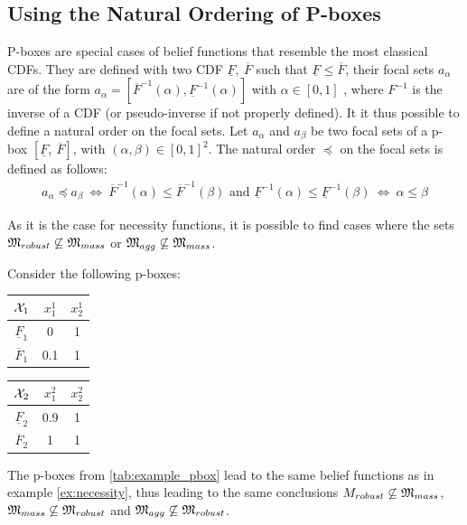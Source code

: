 \subsection{Using the Natural Ordering of P-boxes}\label{subsec:pboxes}
P-boxes are special cases of belief functions that resemble the most classical CDFs. They are defined with two CDF $\underline{F},~\overline{F}$ such that $\underline{F}\leqslant\overline{F}$, their focal sets $a_\alpha$ are of the form $a_\alpha=[\overline{F}^{-1}(\alpha), \underline{F}^{-1}(\alpha)]$ with $\alpha\in[0,1]$ \cite{destercke_unifying_2008}, where $F^{-1}$ is the inverse of a CDF (or pseudo-inverse if not properly defined). It it thus possible to define a natural order on the focal sets. Let $a_\alpha$ and $a_\beta$ be two focal sets of a p-box $[\underline{F},~\overline{F}]$, with $(\alpha,\beta)\in[0,1]^2$. The natural order $\preceq$ on the focal sets is defined as follows:
\begin{align}
    a_\alpha\preceq a_\beta ~\Leftrightarrow~ \overline{F}^{-1}(\alpha)\leqslant\overline{F}^{-1}(\beta) \text{ and } \underline{F}^{-1}(\alpha)\leqslant\underline{F}^{-1}(\beta)~\Leftrightarrow~ \alpha\leqslant\beta\label{eq:order_pbox}
\end{align}

As it is the case for necessity functions, it is possible to find cases where the sets ${\mathfrak{M}}_{robust}\not\subseteq {\mathfrak{M}}_{mass}$ or ${\mathfrak{M}}_{agg}\not\subseteq{\mathfrak{M}}_{mass}$.
\begin{example}\label{ex:pbox}
    Consider the following p-boxes:
    \begin{center}
    \begin{tabular}{|c|c|c|}
        \hline
        ${\mathcal{X}}_1$ & $x^1_1$ & $x^1_2$\\
        \hline\hline
        $\underline{F}_1$ & 0 & 1\\
        \hline
        $\overline{F}_1$ & 0.1 & 1\\
        \hline
    \end{tabular}
    \qquad
    \begin{tabular}{|c|c|c|}
        \hline
        ${\mathcal{X}}_2$ & $x^2_1$ & $x^2_2$\\
        \hline\hline
        $\underline{F}_2$ & 0.9 & 1\\
        \hline
        $\overline{F}_2$ & 1 & 1\\
        \hline
    \end{tabular}
    \label{tab:example_pbox}
    \end{center}
    The p-boxes from \ref{tab:example_pbox} lead to the same belief functions as in example \ref{ex:necessity}, thus leading to the same conclusions \ie ${M}_{robust}\not\subseteq{\mathfrak{M}}_{mass}$, ${\mathfrak{M}}_{mass}\not\subseteq{\mathfrak{M}}_{robust}$ and ${\mathfrak{M}}_{agg}\not\subseteq{\mathfrak{M}}_{robust}$.
\end{example}

